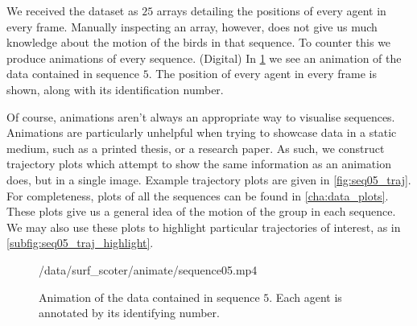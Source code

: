 We received the dataset as $25$ arrays detailing the positions of every agent in every frame. Manually inspecting an array, however, does not give us much knowledge about the motion of the birds in that sequence. To counter this we produce animations of every sequence. (Digital) In \cref{anim:sequence05} we see an animation of the data contained in sequence $5$. The position of every agent in every frame is shown, along with its identification number.

Of course, animations aren't always an appropriate way to visualise sequences. Animations are particularly unhelpful when trying to showcase data in a static medium, such as a printed thesis, or a research paper. As such, we construct trajectory plots which attempt to show the same information as an animation does, but in a single image. Example trajectory plots are given in \cref{fig:seq05_traj}. For completeness, plots of all the sequences can be found in \cref{cha:data_plots}. These plots give us a general idea of the motion of the group in each sequence. We may also use these plots to highlight particular trajectories of interest, as in \cref{subfig:seq05_traj_highlight}. 

\begin{figure}[!tbp]
	\centering
				 {\textwidth}{\textwidth}{/data/surf_scoter/animate/sequence05.mp4}
	\vspace{-190pt}
	\caption{Animation of the data contained in sequence $5$. Each agent is annotated by its identifying number.}
	\label{anim:sequence05}
\end{figure}

